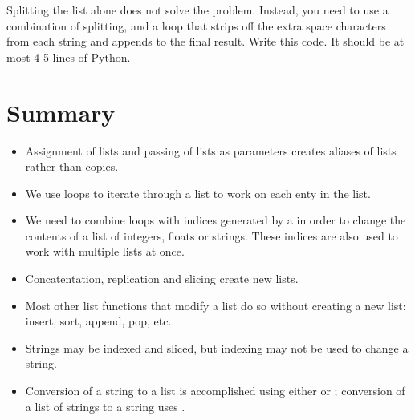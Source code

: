 \documentclass[letterpaper,10pt,english]{sphinxmanual}
\begin{document}
\begin{enumerate}
Splitting the list alone does not solve the problem. Instead, you
need to use a combination of splitting, and a loop that strips off
the extra space characters from each string and appends to the final
result. Write this code. It should be at most 4-5 lines of Python.

\end{enumerate}


\section{Summary}
\label{\detokenize{lecture_notes/lec10_lists2:summary}}\begin{itemize}
\item {} 
Assignment of lists and passing of lists as parameters creates
aliases of lists rather than copies.

\item {} 
We use  loops to iterate through a list to work on each enty
in the list.

\item {} 
We need to combine  loops with indices generated by a
 in order to change the contents of a list of integers,
floats or strings.  These indices are also used to work with
multiple lists at once.

\item {} 
Concatentation, replication and slicing create new lists.

\item {} 
Most other list functions that modify a list do so without creating a
new list: insert, sort, append, pop, etc.

\item {} 
Strings may be indexed and sliced, but indexing may not be used to
change a string.

\item {} 
Conversion of a string to a list is accomplished using either
 or ; conversion of a list of strings to a string
uses .

\end{itemize}
\end{document}
